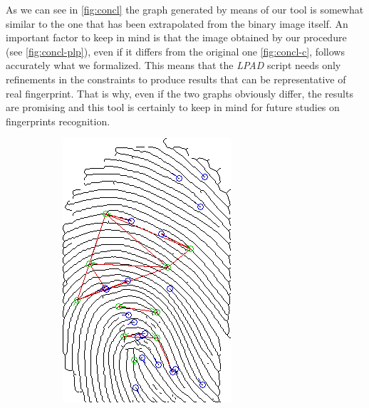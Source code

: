\documentclass[8pt]{article}
\begin{document}
As we can see in \cref{fig:concl} the graph generated by means of our tool is
somewhat similar to the one that has been extrapolated from the binary image
itself.  An important factor to keep in mind is that the image obtained by our
procedure (see \cref{fig:concl-plp}), even if it differs from the original one
\cref{fig:concl-c}, follows accurately what we formalized.  This means that the
\textit{LPAD} script needs only refinements in the constraints to produce
results that can be representative of real fingerprint.  That is why, even if
the two graphs obviously differ, the results are promising and this tool is
certainly to keep in mind for future studies on fingerprints recognition.

\begin{figure}
	\centering
	\begin{subfigure}{.48\textwidth}
		\centering
		\includegraphics[width=0.9\linewidth]{img/c-final}

\end{subfigure}
\end{figure}
\end{document}
